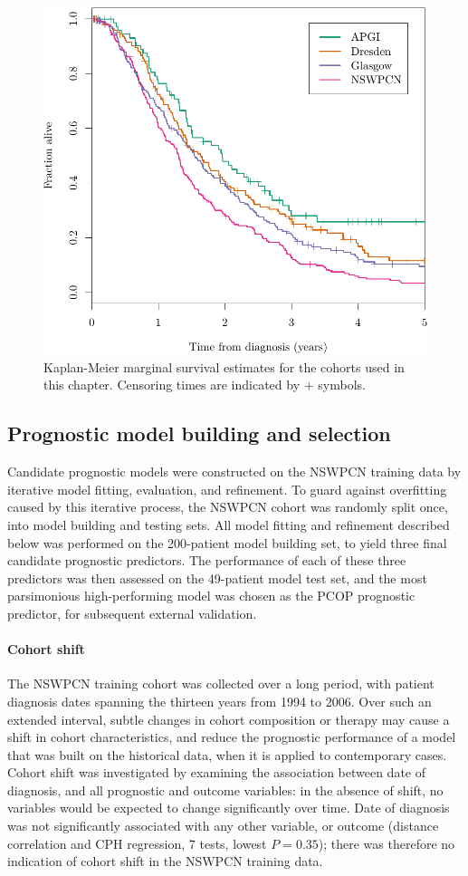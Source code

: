\documentclass[dissertation.tex]{subfiles}
\begin{document}
\begin{figure}
\centering
  \includegraphics[width=.7\textwidth]{analysis/nomogram/figure/07-cohort-surv-comparison-1}
\caption[Cohort marginal survival estimates]{Kaplan-Meier marginal survival estimates for the cohorts used in this chapter.  Censoring times are indicated by $+$ symbols.}
\label{fig:nomo-cohort-km}
\end{figure}

\subsection{Prognostic model building and selection}
Candidate prognostic models were constructed on the \gls{NSWPCN} training data by iterative model fitting, evaluation, and refinement.  To guard against overfitting caused by this iterative process, the \gls{NSWPCN} cohort was randomly split once, into model building and testing sets.  All model fitting and refinement described below was performed on the 200-patient model building set, to yield three final candidate prognostic predictors.  The performance of each of these three predictors was then assessed on the 49-patient model test set, and the most parsimonious high-performing model was chosen as the \gls{PCOP} prognostic predictor, for subsequent external validation.

\paragraph{Cohort shift}
The \gls{NSWPCN} training cohort was collected over a long period, with patient diagnosis dates spanning the thirteen years from 1994 to 2006.  Over such an extended interval, subtle changes in cohort composition or therapy may cause a shift in cohort characteristics, and reduce the prognostic performance of a model that was built on the historical data, when it is applied to contemporary cases.  Cohort shift was investigated by examining the association between date of diagnosis, and all prognostic and outcome variables: in the absence of shift, no variables would be expected to change significantly over time.  Date of diagnosis was not significantly associated with any other variable, or outcome (distance correlation \cite{Szekely2013} and \gls{CPH} regression, 7 tests, lowest $P = 0.35$); there was therefore no indication of cohort shift in the \gls{NSWPCN} training data.
\end{document}
